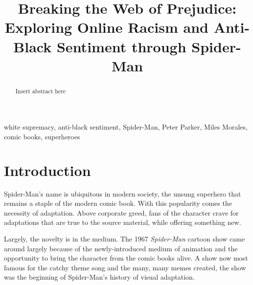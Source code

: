 \documentclass[conference]{IEEEtran}
\begin{document}

\title{Breaking the Web of Prejudice: Exploring Online Racism and Anti-Black Sentiment through Spider-Man}
\author{
\and
{}
\and
{}
}
%
\maketitle             %
%

\begin{abstract}
Insert abstract here
\end{abstract}

\begin{IEEEkeywords}
white supremacy, anti-black sentiment, Spider-Man, Peter Parker, Miles Morales, comic books, superheroes
 \end{IEEEkeywords}


\section{Introduction}

Spider-Man's name is ubiquitous in modern society, the unsung superhero that remains a staple of the modern comic book. With this popularity comes the necessity of adaptation. Above corporate greed, fans of the character crave for adaptations that are true to the source material, while offering something new. 

Largely, the novelty is in the medium. The 1967 \textit{Spider-Man} cartoon show came around largely because of the newly-introduced medium of animation and the opportunity to bring the character from the comic books alive. A show now most famous for the catchy theme song and the many, many memes created, the show was the beginning of Spider-Man's history of visual adaptation.
\end{document}
